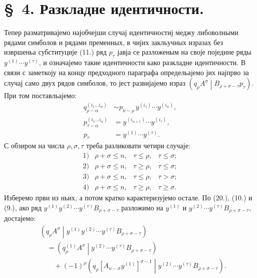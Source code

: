 ﻿\documentclass[11pt]{article}
\newcommand{\pair}[2]{\left(#1\middle|#2\right)}
\begin{document}
\section*{\S\ 4. Разкладне идентичности.}

Тепер разматривајемо најобчејши случај идентичностиј меджу либоволными рядами симболов и рядами пременных, в чијих закльучных изразах без извршеньа субституције (11.) ряд $p_\tau$ јавја се разложеным на своје поједине ряды $y^{(1)}\cdots y^{(\tau)}$, и означајемо такие идентичности како разкладне идентичности. В связи с заметкоју на концу предходного параграфа определьајемо јих најпрво за случај само двух рядов симболов, то јест развијајемо израз $\pair{q_\rho A^\sigma}{B_{\rho+\sigma-\tau}p_\tau}$. При том поставльајемо:
\begin{equation}
\begin{aligned}
q_{\rho-\alpha}^{(i_1\ldots i_\alpha)}
&\sim p_{n-\rho}\,y^{(i_1)}\cdots y^{(i_\alpha)},\\
p_{\tau-\alpha}^{(i_1\ldots i_\alpha)}
&=y^{(i_{\alpha+1})}\cdots y^{(i_\tau)},\\
p_\tau&=y^{(1)}\cdots y^{(\tau)}.
\end{aligned}
\tag{22}
\end{equation}
С обзиром на числа $\rho,\sigma,\tau$ треба разликовати четири случаје:
\[
\begin{array}{llll}
1)&\rho+\sigma\le n,& \tau\le\rho,& \tau\le\sigma;\\[2pt]
2)&\rho+\sigma\le n,& \tau\ge\rho,& \tau\le\sigma;\\[2pt]
3)&\rho+\sigma\le n,& \tau\le\rho,& \tau>\sigma;\\[2pt]
4)&\rho+\sigma\le n,& \tau\ge\rho,& \tau\ge\sigma.
\end{array}
\]
Изберемо први из ньих, а потом кратко карактеризујемо остале. По (20.), (10.) и (9.), ако ряд $y^{(1)}y^{(2)}\cdots y^{(\tau)}B_{\rho+\sigma-\tau}$ разложимо на $y^{(1)}$ и $y^{(2)}\cdots y^{(\tau)}B_{\rho+\sigma-\tau}$, достајемо:
\begin{equation}
\begin{aligned}
&\pair{q_\rho A^\sigma}{y^{(1)}y^{(2)}\cdots y^{(\tau)}
B_{\rho+\sigma-\tau}}\\
&\quad=\pair{q_\rho^{(1)}A^\sigma}
{y^{(2)}\cdots y^{(\tau)}B_{\rho+\sigma-\tau}}\\
&\qquad+(-1)^\rho
\pair{q_\rho[A_{n-\sigma}y^{(1)}]^{\sigma-1}}
{y^{(2)}\cdots y^{(\tau)}B_{\rho+\sigma-\tau}}.
\end{aligned}
\tag{23}
\end{equation}
\end{document}
